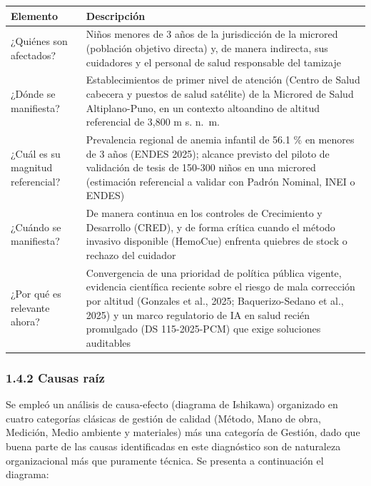 \documentclass[11pt,a4paper]{article}
\begin{document}
{\small
\begin{longtable}[]{@{}
  >{\raggedright\arraybackslash}p{}
  >{\raggedright\arraybackslash}p{}@{}}
\toprule\noalign{}
\begin{minipage}[b]{\linewidth}\raggedright
Elemento
\end{minipage} & \begin{minipage}[b]{\linewidth}\raggedright
Descripción
\end{minipage} \\
\midrule\noalign{}
\endhead
\bottomrule\noalign{}
\endlastfoot
¿Quiénes son afectados? & Niños menores de 3 años de la jurisdicción de la microred (población objetivo directa) y, de manera indirecta, sus cuidadores y el personal de salud responsable del tamizaje \\
¿Dónde se manifiesta? & Establecimientos de primer nivel de atención (Centro de Salud cabecera y puestos de salud satélite) de la Microred de Salud Altiplano-Puno, en un contexto altoandino de altitud referencial de 3,800 m s. n.~m. \\
¿Cuál es su magnitud referencial? & Prevalencia regional de anemia infantil de 56.1 \% en menores de 3 años (ENDES 2025); alcance previsto del piloto de validación de tesis de 150-300 niños en una microred (estimación referencial a validar con Padrón Nominal, INEI o ENDES) \\
¿Cuándo se manifiesta? & De manera continua en los controles de Crecimiento y Desarrollo (CRED), y de forma crítica cuando el método invasivo disponible (HemoCue) enfrenta quiebres de stock o rechazo del cuidador \\
¿Por qué es relevante ahora? & Convergencia de una prioridad de política pública vigente, evidencia científica reciente sobre el riesgo de mala corrección por altitud (Gonzales et al., 2025; Baquerizo-Sedano et al., 2025) y un marco regulatorio de IA en salud recién promulgado (DS 115-2025-PCM) que exige soluciones auditables \\
\end{longtable}
}

\subsubsection{1.4.2 Causas raíz}\label{causas-rauxedz}

Se empleó un análisis de causa-efecto (diagrama de Ishikawa) organizado en cuatro categorías clásicas de gestión de calidad (Método, Mano de obra, Medición, Medio ambiente y materiales) más una categoría de Gestión, dado que buena parte de las causas identificadas en este diagnóstico son de naturaleza organizacional más que puramente técnica. Se presenta a continuación el diagrama:
\end{document}
